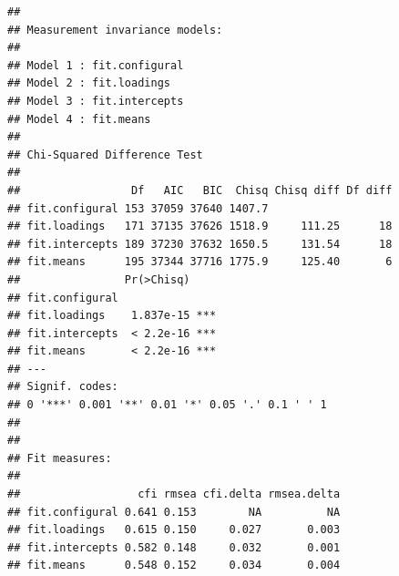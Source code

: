 \documentclass[
  english,
  man]{apa6}
\begin{document}
\begin{verbatim}
## 
## Measurement invariance models:
## 
## Model 1 : fit.configural
## Model 2 : fit.loadings
## Model 3 : fit.intercepts
## Model 4 : fit.means
## 
## Chi-Squared Difference Test
## 
##                 Df   AIC   BIC  Chisq Chisq diff Df diff
## fit.configural 153 37059 37640 1407.7                   
## fit.loadings   171 37135 37626 1518.9     111.25      18
## fit.intercepts 189 37230 37632 1650.5     131.54      18
## fit.means      195 37344 37716 1775.9     125.40       6
##                Pr(>Chisq)    
## fit.configural               
## fit.loadings    1.837e-15 ***
## fit.intercepts  < 2.2e-16 ***
## fit.means       < 2.2e-16 ***
## ---
## Signif. codes:  
## 0 '***' 0.001 '**' 0.01 '*' 0.05 '.' 0.1 ' ' 1
## 
## 
## Fit measures:
## 
##                  cfi rmsea cfi.delta rmsea.delta
## fit.configural 0.641 0.153        NA          NA
## fit.loadings   0.615 0.150     0.027       0.003
## fit.intercepts 0.582 0.148     0.032       0.001
## fit.means      0.548 0.152     0.034       0.004
\end{verbatim}
\end{document}
